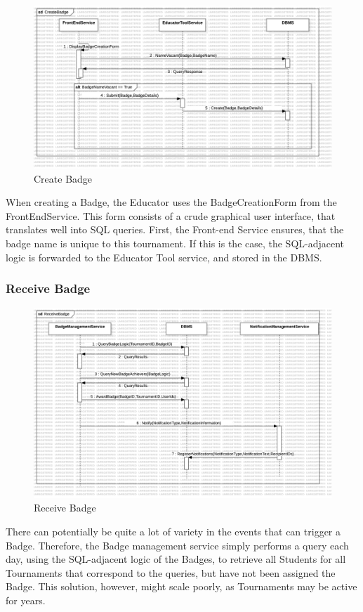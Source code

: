 \begin{figure}[H]
    \centering
    \includegraphics[width=\textwidth]{Graphics/Sequence Diagrams/CreateBadge.png}
    \caption{Create Badge}
    \label{fig:createbadge}
\end{figure}
When creating a Badge, the Educator uses the BadgeCreationForm from the FrontEndService. This form consists of a crude graphical user interface, that translates well into SQL queries. First, the Front-end Service ensures, that the badge name is unique to this tournament. If this is the case, the SQL-adjacent logic is forwarded to the Educator Tool service, and stored in the DBMS. 

\subsubsection{Receive Badge}
\begin{figure}[H]
    \centering
    \includegraphics[width=\textwidth]{Graphics/Sequence Diagrams/ReceiveBadge.png}
    \caption{Receive Badge}
    \label{fig:receivebadge}
\end{figure}
There can potentially be quite a lot of variety in the events that can trigger a Badge. Therefore, the Badge management service simply performs a query each day, using the SQL-adjacent logic of the Badges, to retrieve all Students for all Tournaments that correspond to the queries, but have not been assigned the Badge. This solution, however, might scale poorly, as Tournaments may be active for years.

